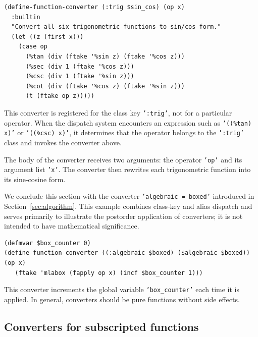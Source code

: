 \documentclass[12pt,fleqn]{extarticle}
\newcommand{\ttq}[1]{\texttt{'#1'}}
\newenvironment{maximabox}
  {\begin{tcolorbox}[
      breakable,
      enhanced,
      colback=white,
      colframe=black!8,
      boxrule=0pt,
      borderline west={2.2pt}{0pt}{black!25},
      arc=1pt,
      left=11pt,
      right=7pt,
      top=9pt,
      bottom=9pt,
      before skip=14pt,
      after skip=14pt
    ]}
  {\end{tcolorbox}}
\begin{document}
\begin{maximabox}
\begin{verbatim}
(define-function-converter (:trig $sin_cos) (op x)
  :builtin
  "Convert all six trigonometric functions to sin/cos form."
  (let ((z (first x)))
    (case op   
      (%tan (div (ftake '%sin z) (ftake '%cos z)))
      (%sec (div 1 (ftake '%cos z)))
      (%csc (div 1 (ftake '%sin z)))
      (%cot (div (ftake '%cos z) (ftake '%sin z)))
      (t (ftake op z)))))
\end{verbatim}
\end{maximabox}
This converter is registered for the class key \ttq{:trig}, not for a particular
operator. When the dispatch system encounters an expression such as
\ttq{((\%tan) x)} or \ttq{((\%csc) x)}, it determines that the operator
belongs to the \ttq{:trig} class and invokes the converter above.

The body of the converter receives two arguments: the operator \ttq{op}
and its argument list \ttq{x}. The converter then rewrites each
trigonometric function into its sine-cosine form. 

We conclude this section with the converter \ttq{algebraic = boxed} introduced in Section~\ref{sec:algorithm}. This example combines class-key and alias dispatch and serves primarily to illustrate the postorder application of converters; it is not intended to have mathematical significance.
\begin{maximabox}
\begin{verbatim}
(defmvar $box_counter 0)
(define-function-converter ((:algebraic $boxed) ($algebraic $boxed)) (op x)
   (ftake 'mlabox (fapply op x) (incf $box_counter 1))) 
\end{verbatim}
\end{maximabox}
\noindent This converter increments the global variable \ttq{box\_counter} each time it is applied. In general, converters should be pure functions without side effects.

\subsection{Converters for subscripted functions}
\end{document}

